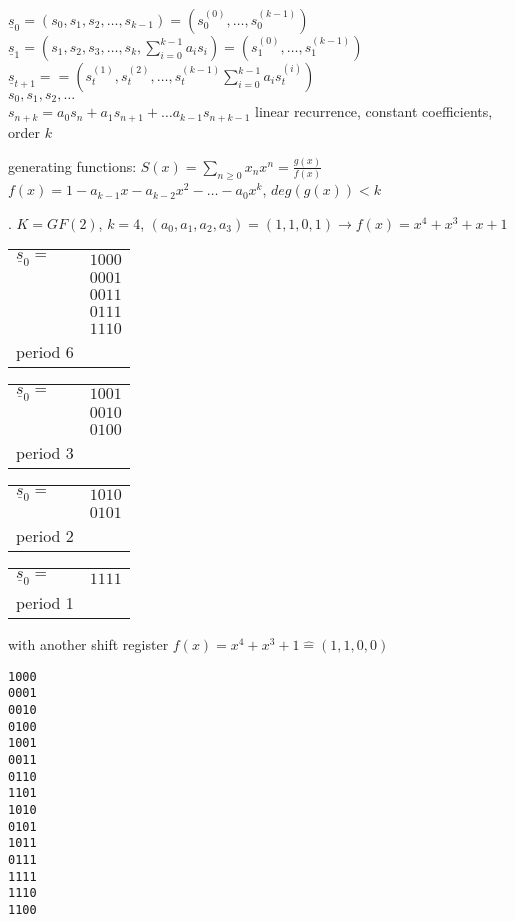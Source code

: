 $\underline{s}_0 = (s_0,s_1,s_2, \ldots, s_{k-1}) = (s_0^{(0)}, \ldots, s_0^{(k-1)})$\\
$\underline{s}_1 = (s_1,s_2,s_3, \ldots, s_{k}, \sum_{i=0}^{k-1}a_is_i) = (s_1^{(0)}, \ldots, s_1^{(k-1)})$\\
$\underline{s}_{t+1} =  = (s_t^{(1)}, s_t^{(2)}, \ldots, s_t^{(k-1)} \sum_{i=0}^{k-1}a_is_t^{(i)})$\\

$s_0,s_1,s_2,\ldots$\\
$s_{n+k} = a_0s_n + a_1 s_{n+1} + \ldots a_{k-1}s_{n+k-1}$ linear recurrence, constant coefficients, order $k$

generating functions: $S(x) = \sum_{n\geq 0}x_nx^n = \frac{g(x)}{f(x)}$\\
$f(x) = 1 -a_{k-1}x - a_{k-2}x^2 - \ldots -a_0 x^k$, $deg(g(x)) <k$

\Example.
$K=GF(2)$, $k=4$, $(a_0,a_1,a_2,a_3) = (1,1,0,1) \to f(x) = x^4 +x^3+x+1$

\begin{tabular}{ll}
  $\underline{s}_0 =$ & $1000$\\
                      & $0001$\\
                      & $0011$\\
                      & $0111$\\
                      & $1110$\\
  period 6
\end{tabular}
\begin{tabular}{ll}
  $\underline{s}_0 =$ & $1001$\\
                      & $0010$\\
                      & $0100$\\
  period 3
\end{tabular}
\begin{tabular}{ll}
  $\underline{s}_0 =$ & $1010$\\
                      & $0101$\\
  period 2
\end{tabular}
\begin{tabular}{ll}
  $\underline{s}_0 =$ & $1111$\\
  period 1
\end{tabular}

with another shift register $f(x) = x^4 + x^3 + 1 \hat{=} (1,1,0,0)$
\begin{verbatim}
1000
0001
0010
0100
1001
0011
0110
1101
1010
0101
1011
0111
1111
1110
1100
\end{verbatim}

